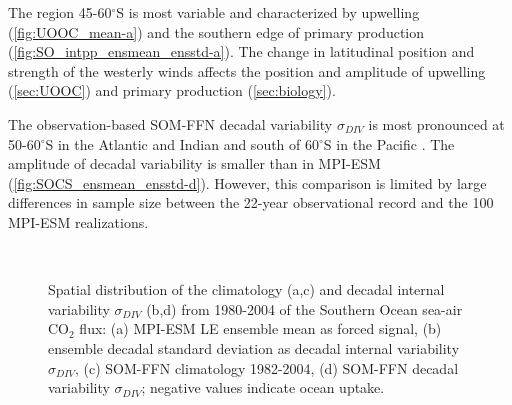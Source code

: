 The region 45-60$^\circ$S is most variable and characterized by upwelling (\autoref{fig:UOOC_mean-a}) and the southern edge of primary production (\autoref{fig:SO_intpp_ensmean_ensstd-a}). The change in latitudinal position and strength of the westerly winds affects the position and amplitude of upwelling (\autoref{sec:UOOC}) and primary production (\autoref{sec:biology}).\newline

The observation-based \acs{SOM-FFN} decadal variability $\sigma_{DIV}$ is most pronounced at 50-60$^\circ$S in the Atlantic and Indian and south of 60$^\circ$S in the Pacific \citep{Landschuetzer2016}. The amplitude of decadal variability is smaller than in \acs{MPI-ESM} (\autoref{fig:SOCS_ensmean_ensstd-d}). However, this comparison is limited by large differences in sample size between the 22-year observational record and the 100 \acs{MPI-ESM} realizations.\newline %



\def\stackalignment{l}



\begin{figure}[bth]
        \\
       
        \caption{Spatial distribution of the climatology (a,c) and decadal internal variability $\sigma_{DIV}$ (b,d) from 1980-2004 of the Southern Ocean sea-air CO$_2$ flux: (a) \acs{MPI-ESM LE} ensemble mean as forced signal, (b) ensemble decadal standard deviation as decadal internal variability $\sigma_{DIV}$, (c) \acs{SOM-FFN} climatology 1982-2004, (d) \acs{SOM-FFN} decadal variability $\sigma_{DIV}$; negative values indicate ocean uptake.} \label{fig:SOCS_ensmean_ensstd}
\end{figure}

